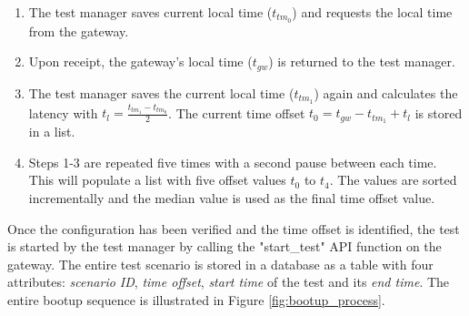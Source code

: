 \begin{enumerate}
    \item The test manager saves current local time ($t_{tm_0}$) and requests the
local time from the gateway.
    \item Upon receipt, the gateway's local time ($t_{gw}$) is returned to the
test manager.
    \item The test manager saves the current local time ($t_{tm_1}$) again and
calculates the latency with $t_l = \frac{t_{tm_1} - t_{tm_0}}{2}$. The current time
offset $t_0 = t_{gw} - t_{tm_1} + t_l$ is stored in a list.
    \item Steps 1-3 are repeated five times with a second pause between each
time. This will populate a list with five offset values $t_0$ to $t_4$. The
values are sorted incrementally and the median value is used as the final
time offset value.
\end{enumerate}

Once the configuration has been verified and the time offset is identified, the
test is started by the test manager by calling the "start\_test" API function on
the gateway. The entire test scenario is stored in a database as a table with
four attributes: \textit{scenario ID}, \textit{time offset}, \textit{start
time} of the test and its \textit{end time}. The entire bootup sequence is
illustrated in Figure \ref{fig:bootup_process}.

